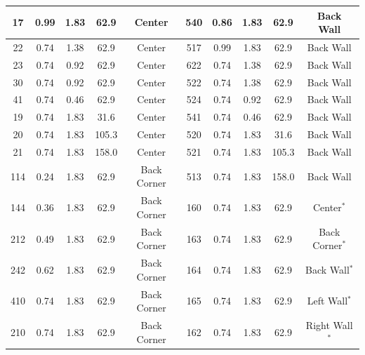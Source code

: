 \begin{table}[h!]
\begin{tabular}{|c|c|c|c|c||c|c|c|c|c|}
17      & 0.99      & 1.83          &  62.9      & Center       & 540   & 0.86      & 1.83        &  62.9         & Back Wall           \\ \hline
22      & 0.74      & 1.38          &  62.9      & Center       & 517   & 0.99      & 1.83        &  62.9         & Back Wall           \\ \hline
23      & 0.74      & 0.92          &  62.9      & Center       & 622   & 0.74      & 1.38        &  62.9         & Back Wall           \\ \hline
30      & 0.74      & 0.92          &  62.9      & Center       & 522   & 0.74      & 1.38        &  62.9         & Back Wall           \\ \hline
41      & 0.74      & 0.46          &  62.9      & Center       & 524   & 0.74      & 0.92        &  62.9         & Back Wall           \\ \hline
19      & 0.74      & 1.83          &  31.6      & Center       & 541   & 0.74      & 0.46        &  62.9         & Back Wall           \\ \hline
20      & 0.74      & 1.83          &  105.3     & Center       & 520   & 0.74      & 1.83        &  31.6         & Back Wall           \\ \hline
21      & 0.74      & 1.83          &  158.0     & Center       & 521   & 0.74      & 1.83        &  105.3        & Back Wall           \\ \hline
114     & 0.24      & 1.83          &  62.9      & Back Corner  & 513   & 0.74      & 1.83        &  158.0        & Back Wall           \\ \hline
144     & 0.36      & 1.83          &  62.9      & Back Corner  & 160   & 0.74      & 1.83        &  62.9         & Center$^*$          \\ \hline
212     & 0.49      & 1.83          &  62.9      & Back Corner  & 163   & 0.74      & 1.83        &  62.9         & Back Corner$^*$     \\ \hline
242     & 0.62      & 1.83          &  62.9      & Back Corner  & 164   & 0.74      & 1.83        &  62.9         & Back Wall$^*$       \\ \hline
410     & 0.74      & 1.83          &  62.9      & Back Corner  & 165   & 0.74      & 1.83        &  62.9         & Left Wall$^*$       \\ \hline
210     & 0.74      & 1.83          &  62.9      & Back Corner  & 162   & 0.74      & 1.83        &  62.9         & Right Wall$^*$      \\ \hline

\end{tabular}
\end{table}
